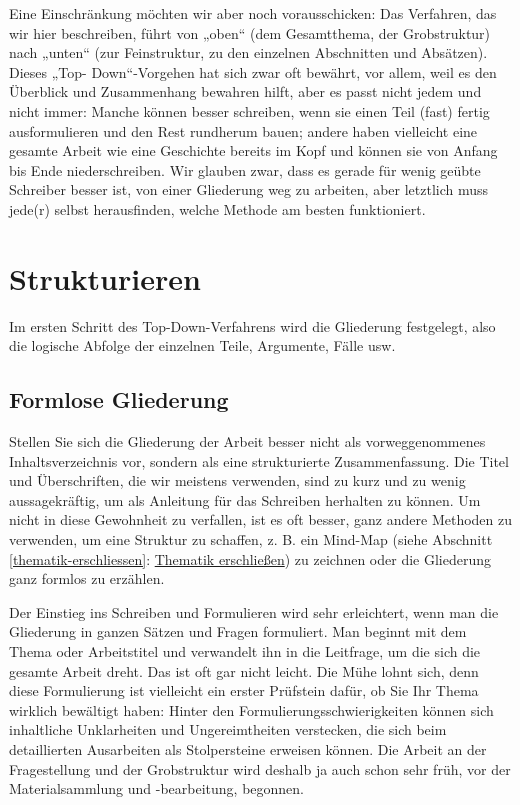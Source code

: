 \documentclass[]{book}
\theoremstyle{definition}
\theoremstyle{definition}
\theoremstyle{definition}
\theoremstyle{remark}
\begin{document}
Eine Einschränkung möchten wir aber noch vorausschicken: Das Verfahren,
das wir hier beschreiben, führt von „oben`` (dem Gesamtthema, der
Grobstruktur) nach „unten`` (zur Feinstruktur, zu den einzelnen
Abschnitten und Absätzen). Dieses „Top- Down``-Vorgehen hat sich zwar
oft bewährt, vor allem, weil es den Überblick und Zusammenhang bewahren
hilft, aber es passt nicht jedem und nicht immer: Manche können besser
schreiben, wenn sie einen Teil (fast) fertig ausformulieren und den Rest
rundherum bauen; andere haben vielleicht eine gesamte Arbeit wie eine
Geschichte bereits im Kopf und können sie von Anfang bis Ende
niederschreiben. Wir glauben zwar, dass es gerade für wenig geübte
Schreiber besser ist, von einer Gliederung weg zu arbeiten, aber
letztlich muss jede(r) selbst herausfinden, welche Methode am besten
funktioniert.

\section{Strukturieren}\label{strukturieren}

Im ersten Schritt des Top-Down-Verfahrens wird die Gliederung
festgelegt, also die logische Abfolge der einzelnen Teile, Argumente,
Fälle usw.

\subsection{Formlose Gliederung}\label{formlose-gliederung}

Stellen Sie sich die Gliederung der Arbeit besser nicht als
vorweggenommenes Inhaltsverzeichnis vor, sondern als eine strukturierte
Zusammenfassung. Die Titel und Überschriften, die wir meistens
verwenden, sind zu kurz und zu wenig aussagekräftig, um als Anleitung
für das Schreiben herhalten zu können. Um nicht in diese Gewohnheit zu
verfallen, ist es oft besser, ganz andere Methoden zu verwenden, um eine
Struktur zu schaffen, z. B. ein Mind-Map (siehe Abschnitt
\ref{thematik-erschliessen}:
\protect\hyperlink{thematik-erschliessen}{Thematik erschließen}) zu
zeichnen oder die Gliederung ganz formlos zu erzählen.

Der Einstieg ins Schreiben und Formulieren wird sehr erleichtert, wenn
man die Gliederung in ganzen Sätzen und Fragen formuliert. Man beginnt
mit dem Thema oder Arbeitstitel und verwandelt ihn in die Leitfrage, um
die sich die gesamte Arbeit dreht. Das ist oft gar nicht leicht. Die
Mühe lohnt sich, denn diese Formulierung ist vielleicht ein erster
Prüfstein dafür, ob Sie Ihr Thema wirklich bewältigt haben: Hinter den
Formulierungsschwierigkeiten können sich inhaltliche Unklarheiten und
Ungereimtheiten verstecken, die sich beim detaillierten Ausarbeiten als
Stolpersteine erweisen können. Die Arbeit an der Fragestellung und der
Grobstruktur wird deshalb ja auch schon sehr früh, vor der
Materialsammlung und -bearbeitung, begonnen.
\end{document}
